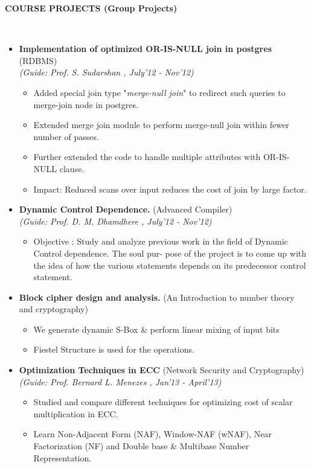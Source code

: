 \documentclass[a4paper,10pt]{article}
\newcommand{\isep}{-2 pt}
\newcommand{\lsep}{-0.5cm}
\newcommand{\resheading}[1]{{\small \colorbox{mygrey}{\begin{minipage}{0.975\textwidth}{\textbf{#1 \vphantom{p\^{E}}}}\end{minipage}}}}
\begin{document}
\resheading{\textbf{COURSE PROJECTS} (Group Projects)}\\[\lsep]

\begin{itemize}
\item \textbf{Implementation of optimized OR-IS-NULL join in postgres} (RDBMS)\\
 \emph{(Guide: Prof. S. Sudarshan
, July'12 - Nov'12)} \\[-0.6cm]
	\begin{itemize}\itemsep \isep
	\item Added special join type "\emph{merge-null join}" to redirect such queries to merge-join node in postgres.
	\item Extended merge join module to perform merge-null join within fewer number of passes.
	\item Further extended the code to handle multiple attributes with OR-IS-NULL clause.
	\item Impact: Reduced scans over input reduces the cost of join by large factor.
	\end{itemize}

\item \textbf{Dynamic Control Dependence.} (Advanced Compiler)\\
 \emph{(Guide: Prof. D. M. Dhamdhere
, July'12 - Nov'12)} \\[-0.6cm]
	\begin{itemize}\itemsep \isep
	\item Objective : Study and analyze previous work in the field of Dynamic Control dependence. The soul pur-
pose of the project is to come up with the idea of how the various statements depends on its predecessor
control statement.
	\end{itemize}

\item \textbf{Block cipher design and analysis.} (An Introduction to number theory and cryptography)
	\begin{itemize}\itemsep \isep
	\item We generate dynamic S-Box \& perform linear mixing of input bits

	\item Fiestel Structure is used for the operations.
	\end{itemize}

\item \textbf{Optimization Techniques in ECC} (Network Security and Cryptography)\\
 \emph{(Guide: Prof. Bernard L. Menezes
, Jan'13 - April'13)} \\[-0.6cm]
	\begin{itemize}\itemsep \isep
	\item Studied and compare different techniques for optimizing cost of scalar multiplication in ECC.
	\item Learn Non-Adjacent Form (NAF), Window-NAF (wNAF), Near Factorization (NF) and Double base \&
Multibase Number Representation.
	\end{itemize}

\end{itemize}
\end{document}

